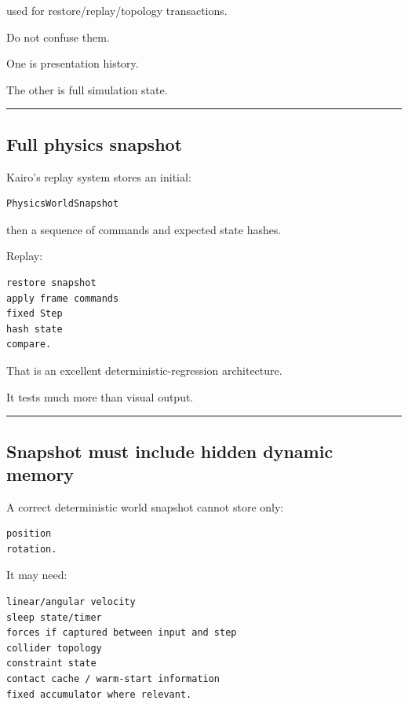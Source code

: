 used for restore/replay/topology transactions.

Do not confuse them.

One is presentation history.

The other is full simulation state.

\begin{center}\rule{0.5\linewidth}{0.5pt}\end{center}

\subsection{Full physics snapshot}\label{06-engine-ii-ch037-full-physics-snapshot}

Kairo's replay system stores an initial:

\begin{verbatim}
PhysicsWorldSnapshot
\end{verbatim}

then a sequence of commands and expected state hashes.

Replay:

\begin{verbatim}
restore snapshot
apply frame commands
fixed Step
hash state
compare.
\end{verbatim}

That is an excellent deterministic-regression architecture.

It tests much more than visual output.

\begin{center}\rule{0.5\linewidth}{0.5pt}\end{center}

\subsection{Snapshot must include hidden dynamic memory}\label{06-engine-ii-ch037-snapshot-must-include-hidden-dynamic-memory}

A correct deterministic world snapshot cannot store only:

\begin{verbatim}
position
rotation.
\end{verbatim}

It may need:

\begin{verbatim}
linear/angular velocity
sleep state/timer
forces if captured between input and step
collider topology
constraint state
contact cache / warm-start information
fixed accumulator where relevant.
\end{verbatim}


